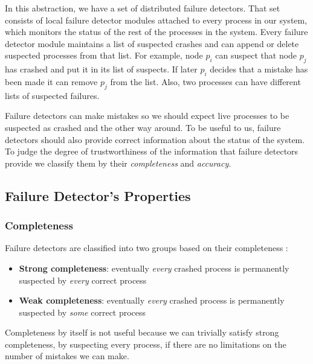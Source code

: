\documentclass[bsc,frontabs,twoside,singlespacing,parskip,deptreport,hidel]{infthesis}     %
\begin{document}
In this abstraction, we have a set of distributed failure detectors. That set consists of local failure detector modules attached to every process in our system, which monitors the status of the rest of the processes in the system. Every failure detector module maintains a list of suspected crashes and can append or delete suspected processes from that list. For example, node $p_i$ can suspect that node $p_j$ has crashed and put it in its list of suspects. If later $p_i$ decides that a mistake has been made it can remove $p_j$ from the list. Also, two processes can have different lists of suspected failures.

Failure detectors can make mistakes so we should expect live processes to be suspected as crashed and the other way around. To be useful to us, failure detectors should also provide correct information about the status of the system. To judge the degree of trustworthiness of the information that failure detectors provide we classify them by their \textit{completeness} and \textit{accuracy}.

\subsection{Failure Detector's Properties}

\subsubsection*{Completeness}
Failure detectors are classified into two groups based on their completeness \cite{chandra1996unreliable}:

\begin{itemize}
  \item \textbf{Strong completeness}: eventually \textit{every} crashed process is permanently suspected by \textit{every} correct process
  \item \textbf{Weak completeness}: eventually \textit{every} crashed process is permanently suspected by \textit{some} correct process
\end{itemize}

Completeness by itself is not useful because we can trivially satisfy strong completeness, by suspecting every process, if there are no limitations on the number of mistakes we can make.
\end{document}
